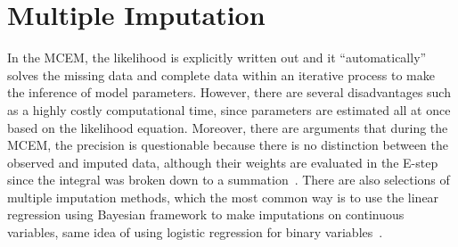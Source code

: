 \documentclass[preprint,12pt]{elsarticle}
\begin{document}
\section{Multiple Imputation}
In the MCEM, the likelihood is explicitly written out and it ``automatically'' solves the missing data and complete data within an iterative process to make the inference of model parameters. 
However, there are several disadvantages such as a highly costly computational time, since parameters are estimated all at once based on the likelihood equation. 
Moreover, there are arguments that during the MCEM, the precision is questionable because there is no distinction between the observed and imputed data, although their weights are evaluated in the E-step since the integral was broken down to a summation~\cite{van2011multiple}. 
There are also selections of multiple imputation methods, which the most common way is to use the linear regression using Bayesian framework to make imputations on continuous variables, same idea of using logistic regression for binary variables~\cite{Rubin1987}. 
\end{document}

